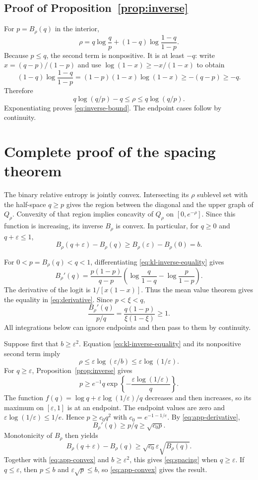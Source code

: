 \documentclass{article}
\theoremstyle{remark}
\newcommand{\eps}{\varepsilon}
\begin{document}
\subsection{Proof of Proposition~\ref{prop:inverse}}

For $p=B_\rho(q)$ in the interior,
\begin{equation}
 \rho=q\log\frac qp+(1-q)\log\frac{1-q}{1-p}.
 \label{eq:kl-inverse-equality}
\end{equation}
Because $p\le q$, the second term is nonpositive.  It is at least $-q$: write $x=(q-p)/(1-p)$ and use $\log(1-x)\ge-x/(1-x)$ to obtain \[ (1-q)\log\frac{1-q}{1-p} =(1-p)(1-x)\log(1-x)\ge-(q-p)\ge-q. \] Therefore \[ q\log(q/p)-q\le\rho\le q\log(q/p). \] Exponentiating proves \eqref{eq:inverse-bound}.  The endpoint cases follow by continuity.

\section{Complete proof of the spacing theorem}
\label{app:geometry}

The binary relative entropy is jointly convex.  Intersecting its $\rho$ sublevel set with the half-space $q\ge p$ gives the region between the diagonal and the upper graph of $Q_\rho$.  Convexity of that region implies concavity of $Q_\rho$ on $[0,e^{-\rho}]$.  Since this function is increasing, its inverse $B_\rho$ is convex.  In particular, for $q\ge0$ and $q+\eps\le1$,
\begin{equation}
 B_\rho(q+\eps)-B_\rho(q)
 \ge B_\rho(\eps)-B_\rho(0)=b.
 \label{eq:app-convex}
\end{equation}

For $0<p=B_\rho(q)<q<1$, differentiating \eqref{eq:kl-inverse-equality} gives \[ B_\rho'(q)=\frac{p(1-p)}{q-p} \left(\log\frac q{1-q}-\log\frac p{1-p}\right). \] The derivative of the logit is $1/[x(1-x)]$.  Thus the mean value theorem gives the equality in \eqref{eq:derivative}.  Since $p<\xi<q$, \[ \frac{B_\rho'(q)}{p/q} =\frac{q(1-p)}{\xi(1-\xi)}\ge1.
 \label{eq:app-derivative}
\] All integrations below can ignore endpoints and then pass to them by continuity.

Suppose first that $b\ge\eps^2$.  Equation \eqref{eq:kl-inverse-equality} and its nonpositive second term imply \[ \rho\le\eps\log(\eps/b)\le\eps\log(1/\eps). \] For $q\ge\eps$, Proposition~\ref{prop:inverse} gives \[ p\ge e^{-1}q\exp\left\{-\frac{\eps\log(1/\eps)}q\right\}. \] The function $f(q)=\log q+\eps\log(1/\eps)/q$ decreases and then increases, so its maximum on $[\eps,1]$ is at an endpoint.  The endpoint values are zero and $\eps\log(1/\eps)\le1/e$.  Hence $p\ge c_0q^2$ with $c_0=e^{-1-1/e}$.  By \eqref{eq:app-derivative}, \[ B_\rho'(q)\ge p/q\ge\sqrt{c_0p}. \] Monotonicity of $B_\rho$ then yields \[ B_\rho(q+\eps)-B_\rho(q) \ge\sqrt{c_0}\eps\sqrt{B_\rho(q)}. \] Together with \eqref{eq:app-convex} and $b\ge\eps^2$, this gives \eqref{eq:spacing} when $q\ge\eps$.  If $q\le\eps$, then $p\le b$ and $\eps\sqrt p\le b$, so \eqref{eq:app-convex} gives the result.
\end{document}
